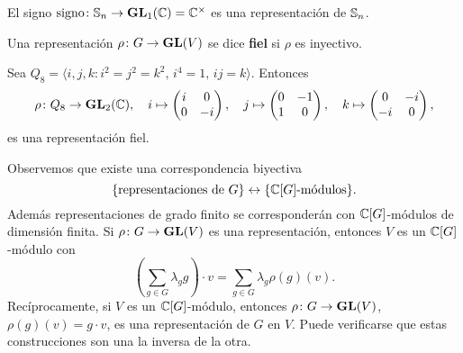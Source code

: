 \begin{example}
El signo $\operatorname{signo}\colon\mathbb{S}_n\to\mathbf{GL}_1(\mathbb{C})=\mathbb{C}^{\times}$ es una representación de $\mathbb{S}_n$.
\end{example}

Una representación $\rho\colon G\to\mathbf{GL}(V)$ se dice \textbf{fiel} si $\rho$
es inyectivo.

\begin{example}
	Sea $Q_8=\langle i,j,k:i^2=j^2=k^2,\,i^4=1,\,ij=k\rangle$. Entonces 
	\[
		\rho\colon Q_8\to\mathbf{GL}_2(\mathbb{C}),\quad
		i\mapsto\begin{pmatrix}
			i & 0\\
			0 & -i
		\end{pmatrix},
		\quad
		j\mapsto\begin{pmatrix}
			0 & -1\\
			1 & 0
		\end{pmatrix},
		\quad
		k\mapsto\begin{pmatrix}
			0 & -i\\
			-i & 0
		\end{pmatrix},
	\]
	es una representación fiel. 
\end{example}

Observemos que existe una correspondencia biyectiva 
\[
\{\text{representaciones de $G$}\}\leftrightarrow\{\text{$\mathbb{C}[G]$-módulos}\}.
\]
Además representaciones de grado finito se corresponderán con $\mathbb{C}[G]$-módulos de dimensión finita. 
Si $\rho\colon G\to\mathbf{GL}(V)$ es una representación, entonces 
$V$ es un $\mathbb{C}[G]$-módulo con
\[
\left(\sum_{g\in G}\lambda_gg\right)\cdot v=\sum_{g\in G}\lambda_g\rho(g)(v).
\]
Recíprocamente, si $V$ es un $\mathbb{C}[G]$-módulo, entonces $\rho\colon G\to\mathbf{GL}(V)$, 
$\rho(g)(v)=g\cdot v$, es una representación de $G$ en $V$. Puede verificarse que estas
construcciones son una la inversa de la otra.  

%


